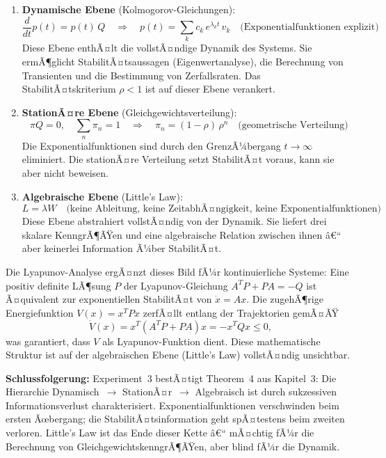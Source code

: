 ﻿\documentclass[a4paper,12pt]{scrreprt}
\theoremstyle{definition}
\begin{document}
\begin{enumerate}
	\item \textbf{Dynamische Ebene} (Kolmogorov-Gleichungen):
	\[
	\frac{d}{dt}p(t) = p(t)\,Q
	\quad\Rightarrow\quad
	p(t) = \sum_k c_k\,e^{\lambda_k t}\,v_k
	\quad\text{(Exponentialfunktionen explizit)}
	\]
	Diese Ebene enthÃ¤lt die vollstÃ¤ndige Dynamik des Systems.
	Sie ermÃ¶glicht StabilitÃ¤tsaussagen (Eigenwertanalyse),
	die Berechnung von Transienten und die Bestimmung von
	Zerfallsraten.  Das StabilitÃ¤tskriterium $\rho < 1$ ist auf
	dieser Ebene verankert.
	
	\item \textbf{StationÃ¤re Ebene} (Gleichgewichtsverteilung):
	\[
	\pi Q = 0, \quad \sum_n \pi_n = 1
	\quad\Rightarrow\quad
	\pi_n = (1-\rho)\,\rho^n
	\quad\text{(geometrische Verteilung)}
	\]
	Die Exponentialfunktionen sind durch den GrenzÃ¼bergang
	$t \to \infty$ eliminiert.  Die stationÃ¤re Verteilung setzt
	StabilitÃ¤t voraus, kann sie aber nicht beweisen.
	
	\item \textbf{Algebraische Ebene} (Little's Law):
	\[
	L = \lambda W
	\quad\text{(keine Ableitung, keine ZeitabhÃ¤ngigkeit,
		keine Exponentialfunktionen)}
	\]
	Diese Ebene abstrahiert vollstÃ¤ndig von der Dynamik.  Sie
	liefert drei skalare KenngrÃ¶ÃŸen und eine algebraische
	Relation zwischen ihnen â€“ aber keinerlei Information Ã¼ber
	StabilitÃ¤t.
	
\end{enumerate}

Die Lyapunov-Analyse ergÃ¤nzt dieses Bild fÃ¼r kontinuierliche Systeme:
Eine positiv definite LÃ¶sung $P$ der Lyapunov-Gleichung
$A^T P + PA = -Q$ ist Ã¤quivalent zur exponentiellen StabilitÃ¤t von
$\dot{x} = Ax$.  Die zugehÃ¶rige Energiefunktion $V(x) = x^T P x$
zerfÃ¤llt entlang der Trajektorien gemÃ¤ÃŸ
\[
\dot{V}(x) = x^T(A^T P + PA)x = -x^T Q x \leq 0,
\]
was garantiert, dass $V$ als Lyapunov-Funktion dient.  Diese
mathematische Struktur ist auf der algebraischen Ebene (Little's Law)
vollstÃ¤ndig unsichtbar.

\textbf{Schlussfolgerung:} Experiment~3 bestÃ¤tigt Theorem~4 aus
Kapitel~3: Die Hierarchie Dynamisch~$\to$ StationÃ¤r~$\to$ Algebraisch
ist durch sukzessiven Informationsverlust charakterisiert.
Exponentialfunktionen verschwinden beim ersten Ãœbergang; die
StabilitÃ¤tsinformation geht spÃ¤testens beim zweiten verloren.
Little's Law ist das Ende dieser Kette â€“ mÃ¤chtig fÃ¼r die Berechnung
von GleichgewichtskenngrÃ¶ÃŸen, aber blind fÃ¼r die Dynamik.
\end{document}
